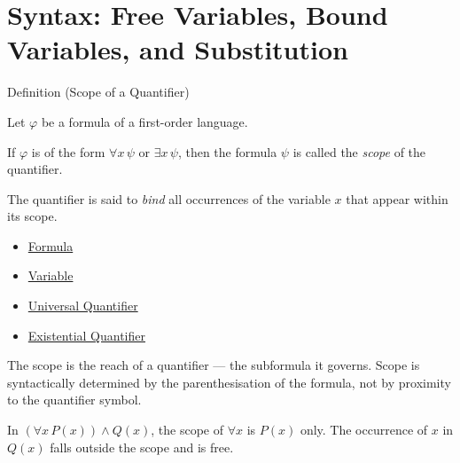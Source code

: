 
\section{Syntax: Free Variables, Bound Variables, and Substitution}


\begin{definitionbox}{Definition (Scope of a Quantifier)}
\begin{definition}\label{def:scope}
Let $\varphi$ be a formula of a first-order language.

If $\varphi$ is of the form $\forall x\,\psi$ or $\exists x\,\psi$, then the
formula $\psi$ is called the \emph{scope} of the quantifier.

The quantifier is said to \emph{bind} all occurrences of the variable $x$ that
appear within its scope.
\end{definition}
\end{definitionbox}

\begin{dependencies}
\begin{itemize}
  \item \hyperref[def:formula]{Formula}
  \item \hyperref[def:variable]{Variable}
  \item \hyperref[def:universal-q]{Universal Quantifier}
  \item \hyperref[def:existential-q]{Existential Quantifier}
\end{itemize}
\end{dependencies}

\begin{remark*}
The scope is the reach of a quantifier --- the subformula it governs. Scope is
syntactically determined by the parenthesisation of the formula, not by
proximity to the quantifier symbol.
\end{remark*}

\begin{example*}
In $(\forall x\,P(x)) \wedge Q(x)$, the scope of $\forall x$ is $P(x)$ only.
The occurrence of $x$ in $Q(x)$ falls outside the scope and is free.
\end{example*}

